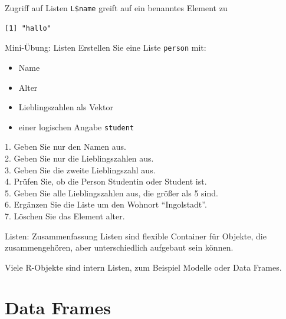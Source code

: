 \documentclass[
  10pt,
  ignorenonframetext,
  aspectratio=169,
]{beamer}
\newenvironment{Shaded}{}{}
\newcommand{\NormalTok}[1]{#1}
\newcommand{\SpecialCharTok}[1]{\textcolor[rgb]{0.25,0.44,0.63}{#1}}
\providecommand{\tightlist}{%
  \setlength{\itemsep}{0pt}\setlength{\parskip}{0pt}}
\begin{document}
\begin{frame}[fragile]{Zugriff auf Listen}
\label{zugriff-auf-listen}
\texttt{L\$name} greift auf ein benanntes Element zu

\begin{Shaded}
\end{Shaded}

\begin{verbatim}
[1] "hallo"
\end{verbatim}
\end{frame}

\begin{frame}[fragile]{Mini-Übung: Listen}
\label{mini-uxfcbung-listen}
Erstellen Sie eine Liste \texttt{person} mit:

\begin{itemize}
\tightlist
\item
  Name
\item
  Alter
\item
  Lieblingszahlen als Vektor
\item
  einer logischen Angabe \texttt{student}
\end{itemize}

1. Geben Sie nur den Namen aus.\\
2. Geben Sie nur die Lieblingszahlen aus.\\
3. Geben Sie die zweite Lieblingszahl aus.\\
4. Prüfen Sie, ob die Person Studentin oder Student ist.\\
5. Geben Sie alle Lieblingszahlen aus, die größer als 5 sind.\\
6. Ergänzen Sie die Liste um den Wohnort ``Ingolstadt''.\\
7. Löschen Sie das Element alter.
\end{frame}

\begin{frame}{Listen: Zusammenfassung}
\label{listen-zusammenfassung}
Listen sind flexible Container für Objekte, die zusammengehören, aber
unterschiedlich aufgebaut sein können.

Viele R-Objekte sind intern Listen, zum Beispiel Modelle oder Data
Frames.
\end{frame}

\section{Data Frames}\label{data-frames}
\end{document}
